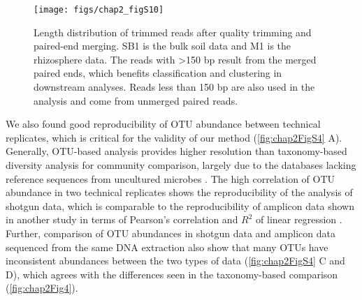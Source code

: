 \documentclass[]{msu-thesis}
\begin{document}
\begin{figure}[tbph!]
  \centering
  \texttt{[image: figs/chap2\_figS10]}
  \caption[Length distribution of trimmed reads after quality trimming and paired-end merging]{Length distribution of trimmed reads after quality trimming and paired-end merging. SB1 is the bulk soil data and M1 is the rhizosphere data. The reads with >150 bp result from the merged paired ends, which benefits classification and clustering in downstream analyses. Reads less than 150 bp are also used in the analysis and come from unmerged paired reads.}
  \label{fig:chap2FigS10}
\end{figure}

We also found good reproducibility of OTU abundance between technical replicates, which is critical for the validity of our method (\cref{fig:chap2FigS4} A). Generally, OTU-based analysis provides higher resolution than taxonomy-based diversity analysis for community comparison, largely due to the databases lacking reference sequences from uncultured microbes \cite{schloss_assessing_2011}. The high correlation of OTU abundance in two technical replicates shows the reproducibility of the analysis of shotgun data, which is comparable to the reproducibility of amplicon data shown in another study in terms of Pearson’s correlation and $R^2$ of linear regression \cite{lundberg_defining_2012}. Further, comparison of OTU abundances in shotgun data and amplicon data sequenced from the same DNA extraction also show that many OTUs have inconsistent abundances between the two types of data (\cref{fig:chap2FigS4} C and D), which agrees with the differences seen in the taxonomy-based comparison (\cref{fig:chap2Fig4}).
\end{document}
